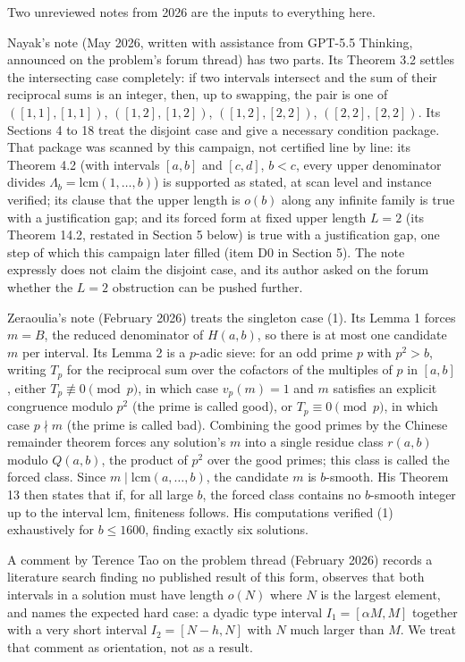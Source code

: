 \documentclass[11pt]{article}
\theoremstyle{remark}
\newcommand{\Hp}{H(a,b)}
\begin{document}
Two unreviewed notes from 2026 are the inputs to everything here.

Nayak's note \cite{nayak} (May 2026, written with assistance from GPT-5.5 Thinking, announced on the problem's forum thread) has two parts. Its Theorem 3.2 settles the intersecting case completely: if two intervals intersect and the sum of their reciprocal sums is an integer, then, up to swapping, the pair is one of $([1,1],[1,1])$, $([1,2],[1,2])$, $([1,2],[2,2])$, $([2,2],[2,2])$. Its Sections 4 to 18 treat the disjoint case and give a necessary condition package. That package was scanned by this campaign, not certified line by line: its Theorem 4.2 (with intervals $[a,b]$ and $[c,d]$, $b < c$, every upper denominator divides $\Lambda_b = \mathrm{lcm}(1, \dots, b)$) is supported as stated, at scan level and instance verified; its clause that the upper length is $o(b)$ along any infinite family is true with a justification gap; and its forced form at fixed upper length $L = 2$ (its Theorem 14.2, restated in Section 5 below) is true with a justification gap, one step of which this campaign later filled (item D0 in Section 5). The note expressly does not claim the disjoint case, and its author asked on the forum whether the $L = 2$ obstruction can be pushed further.

Zeraoulia's note \cite{zeraoulia} (February 2026) treats the singleton case (1). Its Lemma 1 forces $m = B$, the reduced denominator of $\Hp$, so there is at most one candidate $m$ per interval. Its Lemma 2 is a $p$-adic sieve: for an odd prime $p$ with $p^2 > b$, writing $T_p$ for the reciprocal sum over the cofactors of the multiples of $p$ in $[a,b]$, either $T_p \not\equiv 0 \pmod p$, in which case $v_p(m) = 1$ and $m$ satisfies an explicit congruence modulo $p^2$ (the prime is called good), or $T_p \equiv 0 \pmod p$, in which case $p \nmid m$ (the prime is called bad). Combining the good primes by the Chinese remainder theorem forces any solution's $m$ into a single residue class $r(a,b)$ modulo $Q(a,b)$, the product of $p^2$ over the good primes; this class is called the forced class. Since $m \mid \mathrm{lcm}(a, \dots, b)$, the candidate $m$ is $b$-smooth. His Theorem 13 then states that if, for all large $b$, the forced class contains no $b$-smooth integer up to the interval lcm, finiteness follows. His computations verified (1) exhaustively for $b \le 1600$, finding exactly six solutions.

A comment by Terence Tao on the problem thread (February 2026) records a literature search finding no published result of this form, observes that both intervals in a solution must have length $o(N)$ where $N$ is the largest element, and names the expected hard case: a dyadic type interval $I_1 = [\alpha M, M]$ together with a very short interval $I_2 = [N-h, N]$ with $N$ much larger than $M$. We treat that comment as orientation, not as a result.
\end{document}
